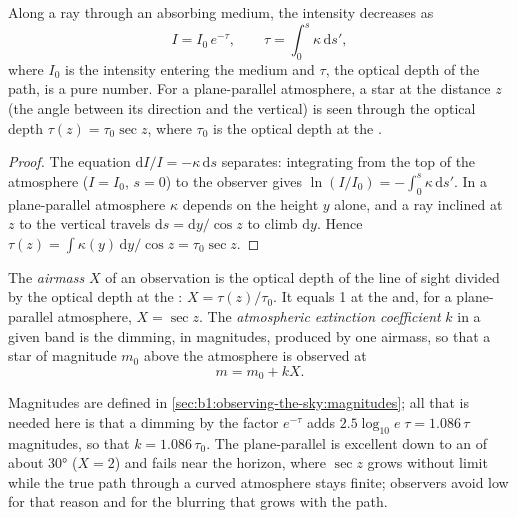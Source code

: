 \begin{proposition}\label{prop:b1:observing-the-sky:bouguer}
Along a ray through an absorbing medium, the intensity decreases as
\[
  I = I_0\,e^{-\tau}, \qquad \tau = \int_0^s \kappa\,\mathrm ds' ,
\]
where $I_0$ is the intensity entering the medium and $\tau$, the optical
depth of the path, is a pure number.
For a plane-parallel atmosphere, a star at the  distance $z$ (the
angle between its direction and the vertical) is seen through the optical
depth $\tau(z) = \tau_0\sec z$, where $\tau_0$ is the optical depth at the
.
\end{proposition}

\begin{proof}
The equation $\mathrm dI/I = -\kappa\,\mathrm ds$ separates: integrating from
the top of the atmosphere ($I = I_0$, $s = 0$) to the observer gives
$\ln(I/I_0) = -\int_0^s\kappa\,\mathrm ds'$. In a plane-parallel atmosphere
$\kappa$ depends on the height $y$ alone, and a ray inclined at $z$ to the
vertical travels $\mathrm ds = \mathrm dy/\cos z$ to climb $\mathrm dy$. Hence
$\tau(z) = \int \kappa(y)\,\mathrm dy/\cos z = \tau_0\sec z$.
\end{proof}

\begin{definition}\label{def:b1:observing-the-sky:extinction}
The \emph{airmass} $X$ of an observation is the optical depth
of the line of sight divided by the optical depth at the :
$X = \tau(z)/\tau_0$. It equals 1 at the  and, for a plane-parallel
atmosphere, $X = \sec z$. The \emph{atmospheric extinction
coefficient} $k$ in a given band
is the dimming, in magnitudes, produced by one airmass, so that a star of
magnitude $m_0$ above the atmosphere is observed at
\[
  m = m_0 + kX .
\]
\end{definition}

Magnitudes are defined in \cref{sec:b1:observing-the-sky:magnitudes}; all
that is needed here is that a dimming by the factor $e^{-\tau}$ adds
$2.5\log_{10}e\;\tau = 1.086\,\tau$ magnitudes, so that $k = 1.086\,\tau_0$.
The plane-parallel  is excellent down to an  of about
\ang{30} ($X = 2$) and fails near the horizon, where $\sec z$ grows without
limit while the true path through a curved atmosphere stays finite;
observers avoid low  for that reason and for the blurring that
grows with the path.

